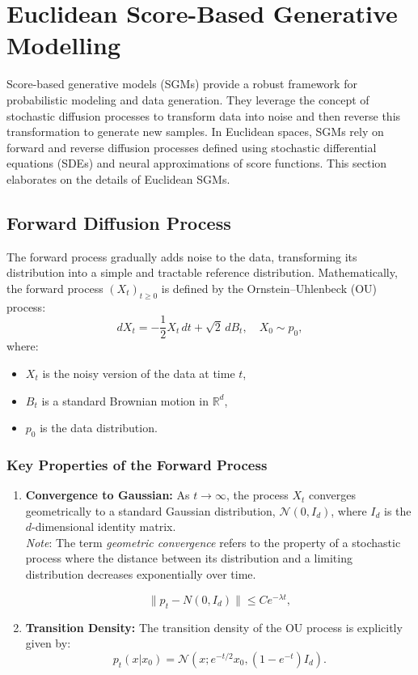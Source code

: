 \documentclass[a4paper,14pt]{article}
\renewcommand{\leq}{\ensuremath{\leqslant}}
\renewcommand{\geq}{\ensuremath{\geqslant}}
\theoremstyle{plain} %
\theoremstyle{definition} %
\theoremstyle{remark} %
\theoremstyle{definition}
\theoremstyle{remark}
\theoremstyle{remark}
\begin{document}
	\section{Euclidean Score-Based Generative Modelling}
	
	Score-based generative models (SGMs) provide a robust framework for probabilistic modeling and data generation. They leverage the concept of stochastic diffusion processes to transform data into noise and then reverse this transformation to generate new samples. In Euclidean spaces, SGMs rely on forward and reverse diffusion processes defined using stochastic differential equations (SDEs) and neural approximations of score functions. This section elaborates on the details of Euclidean SGMs.
	
	\subsection{Forward Diffusion Process}
	
	The forward process gradually adds noise to the data, transforming its distribution into a simple and tractable reference distribution. Mathematically, the forward process \( (X_t)_{t \geq 0} \) is defined by the Ornstein–Uhlenbeck (OU) process:
	\[
	dX_t = -\frac{1}{2} X_t \, dt + \sqrt{2} \, dB_t, \quad X_0 \sim p_0,
	\]
	where:
	\begin{itemize}
		\item \( X_t \) is the noisy version of the data at time \( t \),
		\item \( B_t \) is a standard Brownian motion in \( \mathbb{R}^d \),
		\item \( p_0 \) is the data distribution.
	\end{itemize}
	
	\subsubsection{Key Properties of the Forward Process}
	\begin{enumerate}
		\item \textbf{Convergence to Gaussian:} As \( t \to \infty \), the process \( X_t \) converges geometrically to a standard Gaussian distribution, \( \mathcal{N}(0, I_d) \), where \( I_d \) is the \( d \)-dimensional identity matrix. \\
		\textit{Note}: The term \textit{geometric convergence} refers to the property of a stochastic process where the distance between its distribution and a limiting distribution decreases exponentially over time.
		
		\[
		\| p_t - N(0, I_d) \| \leq Ce^{-\lambda t},
		\]
		
		\item \textbf{Transition Density:} The transition density of the OU process is explicitly given by:
		\[
		p_t(x | x_0) = \mathcal{N}\left(x; e^{-t/2} x_0, (1 - e^{-t}) I_d\right).
		\]
	\end{enumerate}
	
\end{document}
